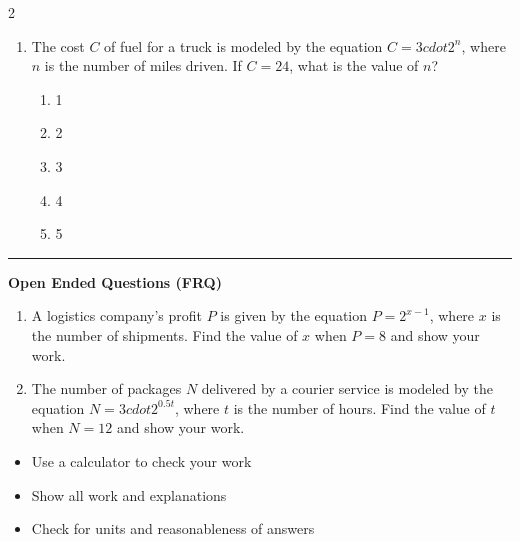 \documentclass[10pt]{article}
\begin{document}
\begin{multicols}{2}
\begin{enumerate}[label=\textbf{Q\arabic*.}, leftmargin=*, itemsep=6pt, parsep=0pt]
  \item \small The cost $C$ of fuel for a truck is modeled by the equation $C = 3 cdot 2^{n}$, where $n$ is the number of miles driven. If $C = 24$, what is the value of $n$?
  \begin{enumerate}[label=(\Alph*), leftmargin=0.6cm, nosep, itemsep=2pt]
    \item 1
    \item 2
    \item 3
    \item 4
    \item 5
  \end{enumerate}

\end{enumerate}
\end{multicols}

\vspace{-0.2cm}
\hrule
\vspace{0.2cm}
\textbf{\small Open Ended Questions (FRQ)}
\begin{enumerate}[label=\textbf{Q\arabic*.}, start=9, itemsep=5pt, topsep=0pt]

  \item \small A logistics company's profit $P$ is given by the equation $P = 2^{x-1}$, where $x$ is the number of shipments. Find the value of $x$ when $P = 8$ and show your work. \vspace{2cm}

  \item \small The number of packages $N$ delivered by a courier service is modeled by the equation $N = 3 cdot 2^{0.5t}$, where $t$ is the number of hours. Find the value of $t$ when $N = 12$ and show your work. \vspace{2cm}

\end{enumerate}

\vfill

\begin{tcolorbox}[colback=blue!5, colframe=mainblue!50, title=\small \textbf{Chef's Tips}, fonttitle=\bfseries, bottom=1mm]
\begin{itemize}[noitemsep, topsep=2pt, leftmargin=0.5cm]
  \item \scriptsize Use a calculator to check your work\item \scriptsize Show all work and explanations\item \scriptsize Check for units and reasonableness of answers
\end{itemize}
\end{tcolorbox}
\end{document}
